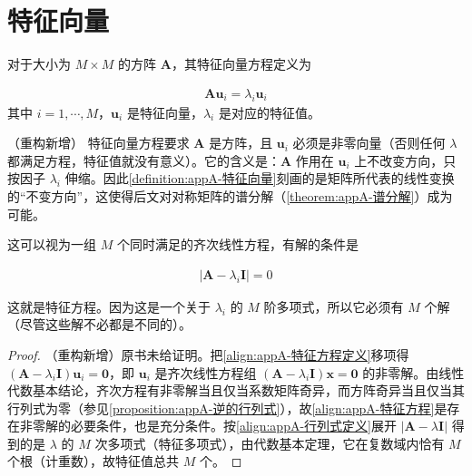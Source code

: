 \documentclass[../main.tex]{subfiles}
\begin{document}
\section{特征向量}\label{section:appA-特征向量}

对于大小为 $M\times M$ 的方阵 $\bm{A}$，其特征向量方程定义为
\begin{definition}[特征向量与特征值]\label{definition:appA-特征向量}
\begin{align}
  \bm{A}\bm{u}_i=\lambda_i\bm{u}_i
  \label{align:appA-特征方程定义}
\end{align}
其中 $i=1,\cdots,M$，$\bm{u}_i$ 是特征向量，$\lambda_i$ 是对应的特征值。
\end{definition}

\begin{remark}（重构新增）
特征向量方程要求 $\bm{A}$ 是方阵，且 $\bm{u}_i$ 必须是非零向量（否则任何 $\lambda$ 都满足方程，特征值就没有意义）。它的含义是：$\bm{A}$ 作用在 $\bm{u}_i$ 上不改变方向，只按因子 $\lambda_i$ 伸缩。因此\cref{definition:appA-特征向量}刻画的是矩阵所代表的线性变换的“不变方向”，这使得后文对对称矩阵的谱分解（\cref{theorem:appA-谱分解}）成为可能。
\end{remark}

这可以视为一组 $M$ 个同时满足的齐次线性方程，有解的条件是
\begin{proposition}[特征方程]\label{proposition:appA-特征方程}
\begin{align}
  |\bm{A}-\lambda_i\bm{I}|=0
  \label{align:appA-特征方程}
\end{align}
\end{proposition}

这就是特征方程。因为这是一个关于 $\lambda_i$ 的 $M$ 阶多项式，所以它必须有 $M$ 个解（尽管这些解不必都是不同的）。

\begin{proof}
（重构新增）原书未给证明。把\eqref{align:appA-特征方程定义}移项得 $(\bm{A}-\lambda_i\bm{I})\bm{u}_i=\bm{0}$，即 $\bm{u}_i$ 是齐次线性方程组 $(\bm{A}-\lambda_i\bm{I})\bm{x}=\bm{0}$ 的非零解。由线性代数基本结论，齐次方程有非零解当且仅当系数矩阵奇异，而方阵奇异当且仅当其行列式为零（参见\cref{proposition:appA-逆的行列式}），故\eqref{align:appA-特征方程}是存在非零解的必要条件，也是充分条件。按\eqref{align:appA-行列式定义}展开 $|\bm{A}-\lambda\bm{I}|$ 得到的是 $\lambda$ 的 $M$ 次多项式（特征多项式），由代数基本定理，它在复数域内恰有 $M$ 个根（计重数），故特征值总共 $M$ 个。
\end{proof}
\end{document}
